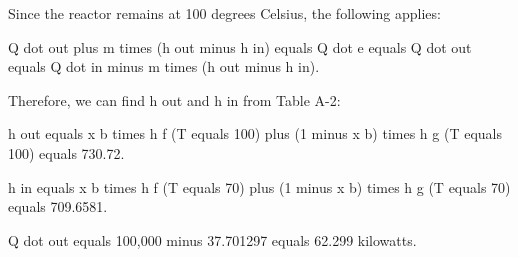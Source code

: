 Since the reactor remains at 100 degrees Celsius, the following applies:

Q dot out plus m times (h out minus h in) equals Q dot e equals Q dot out equals Q dot in minus m times (h out minus h in).

Therefore, we can find h out and h in from Table A-2:

h out equals x b times h f (T equals 100) plus (1 minus x b) times h g (T equals 100) equals 730.72.

h in equals x b times h f (T equals 70) plus (1 minus x b) times h g (T equals 70) equals 709.6581.

Q dot out equals 100,000 minus 37.701297 equals 62.299 kilowatts.